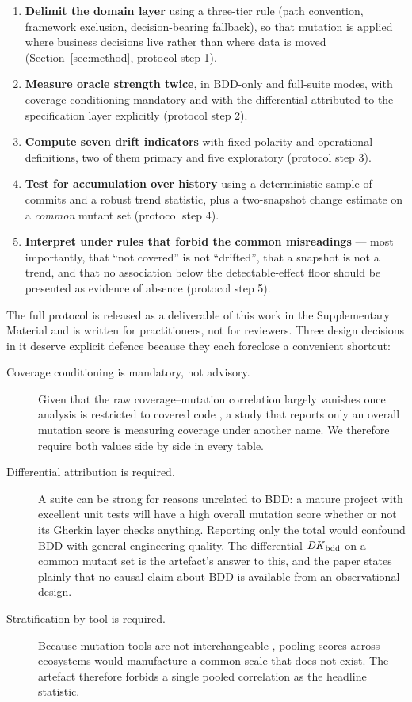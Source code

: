 \begin{enumerate}
\item \textbf{Delimit the domain layer} using a three-tier rule (path convention, framework
      exclusion, decision-bearing fallback), so that mutation is applied where business decisions
      live rather than where data is moved (Section~\ref{sec:method}, protocol step 1).
\item \textbf{Measure oracle strength twice}, in BDD-only and full-suite modes, with coverage
      conditioning mandatory and with the differential attributed to the specification layer
      explicitly (protocol step 2).
\item \textbf{Compute seven drift indicators} with fixed polarity and operational definitions, two of
      them primary and five exploratory (protocol step 3).
\item \textbf{Test for accumulation over history} using a deterministic sample of commits and a
      robust trend statistic, plus a two-snapshot change estimate on a \emph{common} mutant set
      (protocol step 4).
\item \textbf{Interpret under rules that forbid the common misreadings} --- most importantly, that
      ``not covered'' is not ``drifted'', that a snapshot is not a trend, and that no association
      below the detectable-effect floor should be presented as evidence of absence (protocol step 5).
\end{enumerate}

The full protocol is released as a deliverable of this work in the Supplementary Material and is written for
practitioners, not for reviewers. Three design decisions in it deserve explicit defence because they
each foreclose a convenient shortcut:

\begin{description}
\item[Coverage conditioning is mandatory, not advisory.] Given that the raw coverage--mutation
      correlation largely vanishes once analysis is restricted to covered code
      \citep{Jain2023MindTheGap}, a study that reports only an overall mutation score is measuring
      coverage under another name. We therefore require both values side by side in every table.
\item[Differential attribution is required.] A suite can be strong for reasons unrelated to BDD:
      a mature project with excellent unit tests will have a high overall mutation score whether or
      not its Gherkin layer checks anything. Reporting only the total would confound BDD with general
      engineering quality. The differential $\mathit{DK}_{\mathrm{bdd}}$ on a common mutant set is the artefact's answer to
      this, and the paper states plainly that no causal claim about BDD is available from an
      observational design.
\item[Stratification by tool is required.] Because mutation tools are not interchangeable
      \citep{Kintis2018HowEffectiveTools}, pooling scores across ecosystems would manufacture a
      common scale that does not exist. The artefact therefore forbids a single pooled correlation as
      the headline statistic.
\end{description}


